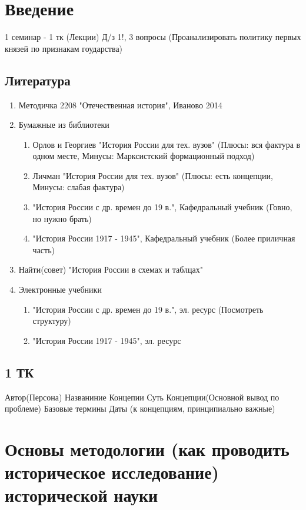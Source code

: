 \documentclass[a4paper]{article}
\begin{document}
\section{Введение}

1 семинар - 1 тк (Лекции)
Д/з 1!, 3 вопросы (Проанализировать
политику первых князей по признакам гоударства)
\subsection{Литература}

\begin{enumerate}
\item Методичка 2208
"Отечественная история", Иваново 2014
\item Бумажные из библиотеки
    \begin{enumerate}
    \item Орлов и Георгиев "История России для тех. вузов"
    (Плюсы: вся фактура в одном месте, Минусы: Марксистский формационный подход)
    \item Личман "История России для тех. вузов"
    (Плюсы: есть концепции, Минусы: слабая фактура)
    \item "История России с др. времен до 19 в.", Кафедральный учебник
    (Говно, но нужно брать)
    \item "История России 1917 - 1945", Кафедральный учебник
    (Более приличная часть)
    \end{enumerate}
\item Найти(совет) "История России в схемах и таблцах"
\item Электронные учебники
    \begin{enumerate}
    \item "История России с др. времен до 19 в.", эл. ресурс
    (Посмотреть структуру)
    \item "История России 1917 - 1945", эл. ресурс
    \end{enumerate}
\end{enumerate}

\subsection{1 ТК}

Автор(Персона)
Названиние Концепии
Суть Концепции(Основной вывод по проблеме)
Базовые термины
Даты (к концепциям, принципиально важные)

\section{Основы методологии (как проводить историческое исследование)
исторической науки}
\end{document}
